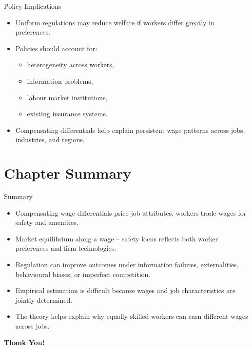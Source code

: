 \documentclass[aspectratio=169]{beamer}
\begin{document}
\begin{frame}{Policy Implications}
\transfade
\begin{itemize}
  \item Uniform regulations may reduce welfare if workers differ greatly in preferences.
  \item Policies should account for:
  \begin{itemize}
    \item heterogeneity across workers,
    \item information problems,
    \item labour market institutions,
    \item existing insurance systems.
  \end{itemize}
  \item Compensating differentials help explain persistent wage patterns across jobs, industries, and regions.
\end{itemize}
\end{frame}

\section{Chapter Summary}

\begin{frame}{Summary}
\transfade
\begin{itemize}
  \item Compensating wage differentials price job attributes: workers trade wages for safety and amenities.
  \item Market equilibrium along a wage -- safety locus reflects both worker preferences and firm technologies.
  \item Regulation can improve outcomes under information failures, externalities, behavioural biases, or imperfect competition.
  \item Empirical estimation is difficult because wages and job characteristics are jointly determined.
  \item The theory helps explain why equally skilled workers can earn different wages across jobs.
\end{itemize}
\end{frame}

\begin{frame}
\centering
\Huge{\textbf{Thank You!}}
\end{frame}
\end{document}
